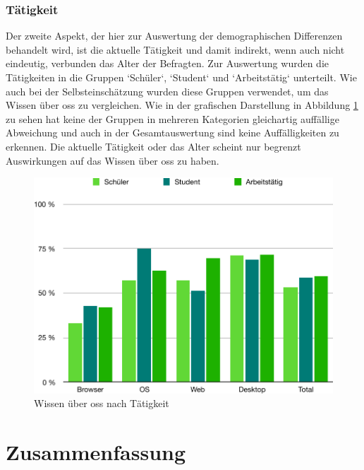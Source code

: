 \documentclass[a4paper]{article}
\begin{document}
            \subsubsection{Tätigkeit}
                Der zweite Aspekt, der hier zur Auswertung der demographischen Differenzen behandelt wird, ist die aktuelle Tätigkeit und damit indirekt, wenn auch nicht eindeutig, verbunden das Alter der Befragten. Zur Auswertung wurden die Tätigkeiten in die Gruppen `Schüler`, `Student` und `Arbeitstätig` unterteilt. Wie auch bei der Selbsteinschätzung wurden diese Gruppen verwendet, um das Wissen über \gls{oss} zu vergleichen. Wie in der grafischen Darstellung in Abbildung \ref{figure:knowledge_by_occupation} zu sehen hat keine der Gruppen in mehreren Kategorien gleichartig auffällige Abweichung und auch in der Gesamtauswertung sind keine Auffälligkeiten zu erkennen. Die aktuelle Tätigkeit oder das Alter scheint nur begrenzt Auswirkungen auf das Wissen über \gls{oss} zu haben.
            
            \begin{figure}
                \includegraphics[width=\textwidth]{assets/results/openSourceJudging/openSourceJudgingDetailedOSSOnlyByOccupation.pdf}
                \caption{Wissen über \gls{oss} nach Tätigkeit}
                \label{figure:knowledge_by_occupation}
            \end{figure}
            
    
    
    \clearpage
    \section{Zusammenfassung}
\end{document}
